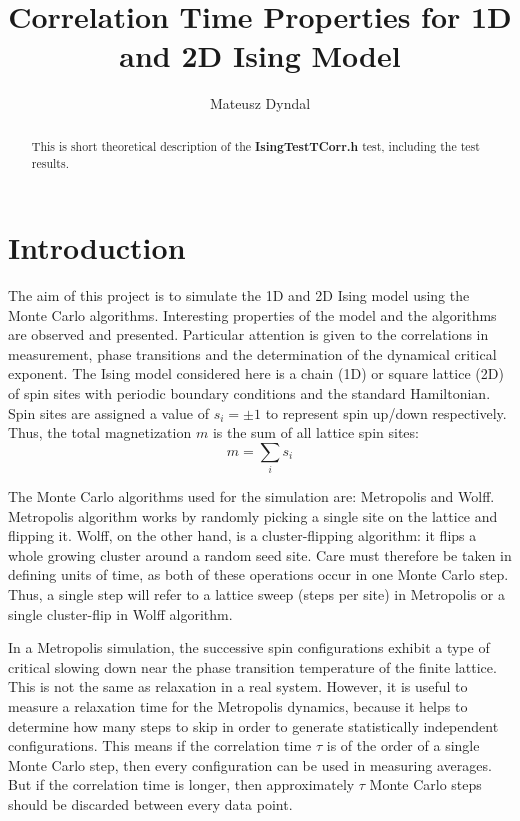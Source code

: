 \documentclass[11pt,a4paper]{article}%
\begin{document}
\title{Correlation Time Properties for 1D and 2D Ising Model}
\author{Mateusz Dyndal}
\maketitle

\begin{abstract}
This is short theoretical description of the 
\textbf{IsingTestTCorr.h} test, including the test results.
\end{abstract}


\section{Introduction}
The aim of this project is to simulate the 1D and 2D Ising model using the Monte Carlo algorithms. Interesting properties of the model and the algorithms are observed and presented. Particular attention is given to the correlations in measurement, phase transitions and the determination of the dynamical critical exponent. 
The Ising model considered here is a chain (1D) or square lattice (2D) of spin sites with periodic boundary conditions and the standard Hamiltonian. Spin sites are assigned a value of $s_{i}=\pm1$ to represent spin up/down respectively. Thus, the total magnetization $m$ is the sum of all lattice spin sites:
\begin{equation}
m=\sum_{i}s_{i}
\end{equation}

The Monte Carlo algorithms used for the simulation are: Metropolis and Wolff. 
Metropolis algorithm works by randomly picking a single site on the lattice and flipping it. Wolff, on the other hand, is a cluster-flipping algorithm: it flips a whole growing cluster around a random seed site. 
Care must therefore be taken in defining units of time, as both of these operations occur in one Monte Carlo step. Thus, a single step will refer to a lattice sweep (steps per site) in Metropolis or a single cluster-flip in Wolff algorithm.

In a Metropolis simulation, the successive spin configurations exhibit
a type of critical slowing down near the phase transition temperature
of the finite lattice. This is not the same as relaxation in a real
system. However, it is useful to measure a relaxation time for the
Metropolis dynamics, because it helps to determine how many steps to
skip in order to generate statistically independent configurations.
This means if the correlation time $\tau$ is of the order of a single
Monte Carlo step, then every configuration can be used in measuring
averages. But if the correlation time is longer, then approximately $\tau$ Monte Carlo steps should be discarded between every data point.
\end{document}
